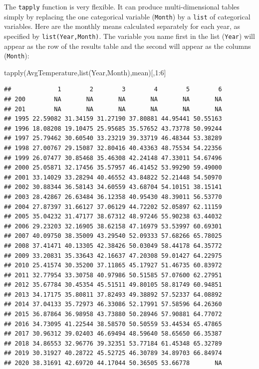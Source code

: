 \documentclass[
]{book}
\newenvironment{Shaded}{\begin{snugshade}}{\end{snugshade}}
\newcommand{\DecValTok}[1]{\textcolor[rgb]{0.00,0.00,0.81}{#1}}
\newcommand{\FunctionTok}[1]{\textcolor[rgb]{0.00,0.00,0.00}{#1}}
\newcommand{\NormalTok}[1]{#1}
\newcommand{\SpecialCharTok}[1]{\textcolor[rgb]{0.00,0.00,0.00}{#1}}
\begin{document}
The \texttt{tapply} function is very flexible. It can produce multi-dimensional tables simply by replacing the one categorical variable (\texttt{Month}) by a \texttt{list} of categorical variables. Here are the monthly means calculated separately for each year, as specified by \texttt{list(Year,Month)}. The variable you name first in the list (\texttt{Year}) will appear as the row of the results table and the second will appear as the columns (\texttt{Month}):

\begin{Shaded}
\begin{Highlighting}[]
\FunctionTok{tapply}\NormalTok{(AvgTemperature,}\FunctionTok{list}\NormalTok{(Year,Month),mean)[,}\DecValTok{1}\SpecialCharTok{:}\DecValTok{6}\NormalTok{]}
\end{Highlighting}
\end{Shaded}

\begin{verbatim}
##             1        2        3        4        5        6
## 200        NA       NA       NA       NA       NA       NA
## 201        NA       NA       NA       NA       NA       NA
## 1995 22.59082 31.34159 31.27190 37.80881 44.95441 50.55163
## 1996 18.08208 19.10475 25.95685 35.57652 43.73778 50.99244
## 1997 25.79462 30.60540 33.23219 39.33719 46.48344 53.38289
## 1998 27.00767 29.15087 32.80416 40.43363 48.75534 54.22356
## 1999 26.07477 30.85468 35.46308 42.24148 47.33011 54.67496
## 2000 25.05871 32.17456 35.57957 46.41452 53.99290 59.49000
## 2001 33.14029 33.28294 40.46552 43.84822 52.21448 54.50970
## 2002 30.88344 36.58143 34.60559 43.68704 54.10151 38.15141
## 2003 28.42867 26.63484 36.12358 40.95430 48.39011 56.53770
## 2004 27.87397 31.66127 37.06129 44.72202 52.05897 62.11159
## 2005 35.04232 31.47177 38.67312 48.97246 55.90238 63.44032
## 2006 29.23203 32.16905 38.62158 47.16979 53.53997 60.69301
## 2007 40.09750 38.35009 43.29540 52.09333 57.68266 65.78025
## 2008 37.41471 40.13305 42.38426 50.03049 58.44178 64.35772
## 2009 33.20831 35.33643 42.16637 47.20308 59.01427 64.22975
## 2010 25.41574 30.35200 37.11865 45.17927 51.46735 60.83972
## 2011 32.77954 33.30758 40.97986 50.51585 57.07600 62.27951
## 2012 35.67784 30.45354 45.51511 49.80105 58.81749 60.94851
## 2013 34.17175 35.80811 37.82493 49.38892 57.52337 64.08892
## 2014 37.04133 35.72973 46.33086 52.17991 57.58596 64.26360
## 2015 36.87864 36.98958 43.73880 50.28946 57.90881 64.77072
## 2016 34.73095 41.22544 38.58570 50.50559 53.44534 65.47865
## 2017 30.96312 39.02403 46.69494 48.59640 58.65650 66.35387
## 2018 34.86553 32.96776 39.32351 53.77184 61.45348 65.32789
## 2019 30.31927 40.28722 45.52725 46.30789 34.89703 66.84974
## 2020 38.31691 42.69720 44.17044 50.36505 53.66778       NA
\end{verbatim}
\end{document}
